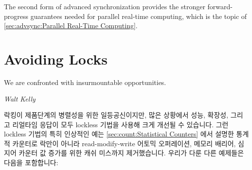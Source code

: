 The second form of advanced synchronization provides the stronger
forward-progress guarantees needed for parallel real-time computing,
which is the topic of
\cref{sec:advsync:Parallel Real-Time Computing}.

\fi

\section{Avoiding Locks}
\label{sec:advsync:Avoiding Locks}
%
\epigraph{We are confronted with insurmountable opportunities.}
	 {\emph{Walt Kelly}}

락킹이 제품단계의 병렬성을 위한 일등공신이지만, 많은 상황에서 성능, 확장성,
그리고 리얼타임 응답이 모두 lockless 기법을 사용해 크게 개선될 수 있습니다.
그런 lockless 기법의 특히 인상적인 예는 
\cref{sec:count:Statistical Counters} 에서 설명한 통계적 카운터로 락만이 아니라
read-modify-write 어토믹 오퍼레이션, 메모리 배리어, 심지어 카운터 값 증가를
위한 캐쉬 미스까지 제거했습니다.
우리가 다룬 다른 예제들은 다음을 포함합니다:

\iffalse

Although locking is the workhorse of parallelism in production, in
many situations performance, scalability, and real-time response can
all be greatly improved through use of lockless techniques.
A particularly impressive example of such a lockless technique is
the statistical counters described in
\cref{sec:count:Statistical Counters},
which avoids not only locks, but also atomic operations, memory barriers,
and even cache misses for counter increments.
Other examples we have covered include:

\fi

